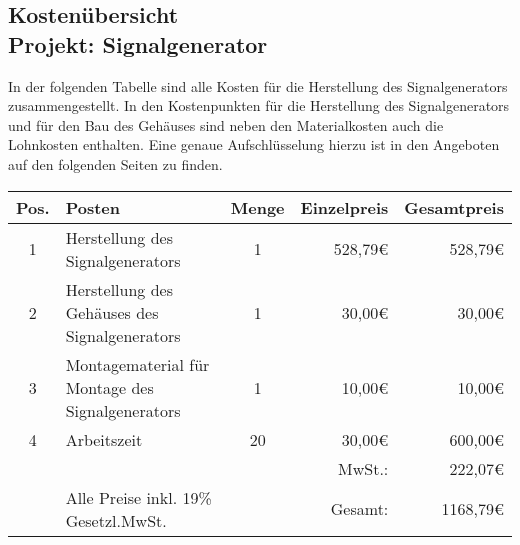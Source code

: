 \begin{center}
\section*{Kostenübersicht \\ Projekt: Signalgenerator}
\end{center}
In der folgenden Tabelle sind alle Kosten für die Herstellung des Signalgenerators zusammengestellt. In den Kostenpunkten für die Herstellung des Signalgenerators und für den Bau des Gehäuses sind neben den Materialkosten auch die Lohnkosten enthalten. Eine genaue Aufschlüsselung hierzu ist in den Angeboten auf den folgenden Seiten zu finden.
\bigskip
\begin{center}

\begin{tabular}{cp{7cm}cr|r|}
\hline
\multicolumn{1}{|l|}{Pos.} & \multicolumn{1}{l|}{Posten} & \multicolumn{1}{l|}{Menge} & Einzelpreis & Gesamtpreis \\ \hline
\multicolumn{1}{|c|}{1} & \multicolumn{1}{l|}{Herstellung des Signalgenerators} & \multicolumn{1}{c|}{1} & 528,79\euro & 528,79\euro \\ \hline
\multicolumn{1}{|c|}{2} & \multicolumn{1}{l|}{Herstellung des Gehäuses des Signalgenerators} & \multicolumn{1}{c|}{1} & 30,00\euro & 30,00\euro \\ \hline
\multicolumn{1}{|c|}{3} & \multicolumn{1}{l|}{Montagematerial für Montage des Signalgenerators} & \multicolumn{1}{c|}{1} & 10,00\euro & 10,00\euro \\ \hline
\multicolumn{1}{|c|}{4} & \multicolumn{1}{l|}{Arbeitszeit} & \multicolumn{1}{c|}{20} & 30,00\euro & 600,00\euro \\ \hline
 & & & MwSt.: & 222,07\euro \\ \cline{5-5}
                        & Alle Preise inkl. 19\% Gesetzl.MwSt. &                       & Gesamt: & 1168,79\euro \\ \cline{5-5} 
\end{tabular}

\end{center}



